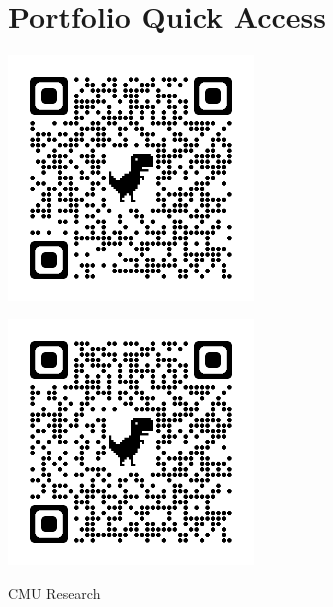 \documentclass[letterpaper,10pt]{article}
\begin{document}
\section{Portfolio Quick Access}
  \begin{center}
    \begin{minipage}{0.45\textwidth}
        \centering
        \includegraphics[width=6.5cm, height=6.5cm]{Figures/HUMRS.png}
        \label{fig:image1}
    \end{minipage}
    \hspace{0.05\textwidth}
    \begin{minipage}{0.45\textwidth}
        \centering
        \includegraphics[width=6.5cm, height=6.5cm]{Figures/Apple.png}
        \label{fig:image2}
    \end{minipage}
    CMU Research
    \vspace{0.5cm} %


\end{center}
\end{document}
